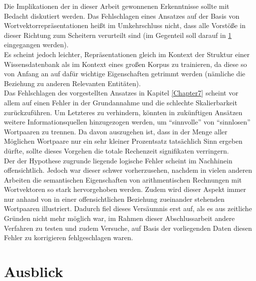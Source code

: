 Die Implikationen der in dieser Arbeit gewonnenen Erkenntnisse sollte mit Bedacht diskutiert werden. Das Fehlschlagen
eines Ansatzes auf der Basis von Wortvektorrepräsentationen heißt im Umkehrschluss nicht, dass alle Vorstöße in dieser
Richtung zum Scheitern verurteilt sind (im Gegenteil soll darauf in \ref{sec:fazit-ausblick} eingegangen werden).\\
Es scheint jedoch leichter, Repräsentationen gleich im Kontext der Struktur einer Wissensdatenbank als im
Kontext eines großen Korpus zu trainieren, da diese so von Anfang an auf dafür wichtige Eigenschaften getrimmt werden
(nämliche die Beziehung zu anderen Relevanten Entitäten).\\

Das Fehlschlagen des vorgestellten Ansatzes in Kapitel \ref{Chapter7} scheint vor allem auf einen Fehler in der
Grundannahme und die schlechte Skalierbarkeit zurückzuführen. Um Letzteres zu verhindern, könnten in zukünftigen Ansätzen
weitere Informationsquellen hinzugezogen werden, um ``sinnvolle'' von ``sinnlosen'' Wortpaaren zu trennen. Da davon
auszugehen ist, dass in der Menge aller Möglichen Wortpaare nur ein sehr kleiner Prozentsatz tatsächlich Sinn ergeben
dürfte, sollte dieses Vorgehen die totale Rechenzeit signifikaten verringern.\\
Der der Hypothese zugrunde liegende logische Fehler scheint im Nachhinein offensichtlich. Jedoch war dieser schwer
vorherzusehen, nachdem in vielen anderen Arbeiten die semantischen Eigenschaften von arithmentischen Rechnungen mit
Wortvektoren so stark hervorgehoben werden. Zudem wird dieser Aspekt immer nur anhand von in einer offensichtlichen
Beziehung zueinander stehenden Wortpaaren illustriert. Dadurch fiel dieses Versäumnis erst auf, als es aus zeitliche Gründen
nicht mehr möglich war, im Rahmen dieser Abschlussarbeit andere Verfahren zu testen und zudem Versuche, auf Basis der
vorliegenden Daten diesen Fehler zu korrigieren fehlgeschlagen waren.

\section{Ausblick}\label{sec:fazit-ausblick}

